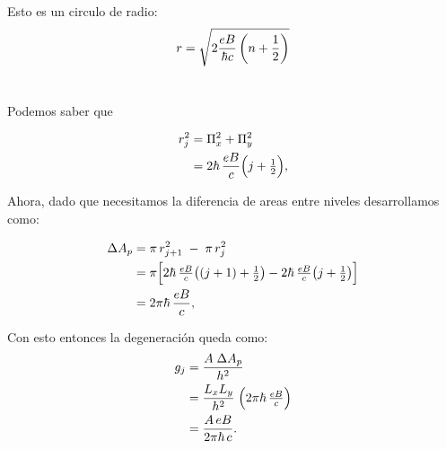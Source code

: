 \documentclass{report}
\begin{document}
Esto es un circulo de radio:
\[
  r = \sqrt{2\frac{eB}{\hbar c}\left(n + \frac{1}{2}\right)}
\]

\section{}

Podemos saber que

\begin{align*}
r_j^2 &= \Pi_x^2 + \Pi_y^2\\
  &= 2\hbar\,\frac{eB}{c}\Bigl(j + \tfrac12\Bigr),
\end{align*}

Ahora, dado que necesitamos la diferencia de areas entre niveles desarrollamos como:


\begin{align*}
\Delta A_p &= \pi\,r_{j+1}^2 \;-\;\pi\,r_j^2\\
&= \pi\Bigl[2\hbar\,\tfrac{eB}{c}\bigl((j+1)+\tfrac12\bigr)
     -2\hbar\,\tfrac{eB}{c}\bigl(j+\tfrac12\bigr)\Bigr]\\
&= 2\pi\hbar\,\frac{eB}{c},
\end{align*}

Con esto entonces la degeneración queda como:
\begin{align*}
g_j &= \frac{A\;\Delta A_p}{h^2}\\
  &= \frac{L_xL_y}{h^2}\;\Bigl(2\pi\hbar\,\tfrac{eB}{c}\Bigr)\\
&= \frac{A\,eB}{2\pi\hbar\,c}.
\end{align*}

\section{}
\end{document}
